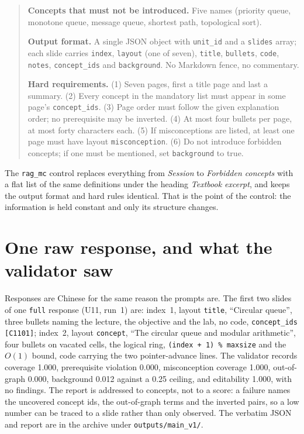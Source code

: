 \documentclass[11pt,a4paper]{article}
\newcommand{\id}[1]{\texttt{#1}}
\begin{document}
\begin{quote}
\textbf{Concepts that must not be introduced.} Five names (priority queue,
monotone queue, message queue, shortest path, topological sort).

\textbf{Output format.} A single JSON object with \id{unit\_id} and a
\id{slides} array; each slide carries \id{index}, \id{layout} (one of seven),
\id{title}, \id{bullets}, \id{code}, \id{notes}, \id{concept\_ids} and
\id{background}. No Markdown fence, no commentary.

\textbf{Hard requirements.} (1) Seven pages, first a title page and last a
summary. (2) Every concept in the mandatory list must appear in some page's
\id{concept\_ids}. (3) Page order must follow the given explanation order; no
prerequisite may be inverted. (4) At most four bullets per page, at most forty
characters each. (5) If misconceptions are listed, at least one page must have
layout \id{misconception}. (6) Do not introduce forbidden concepts; if one must
be mentioned, set \id{background} to true.
\end{quote}

The \id{rag\_mc} control replaces everything from \emph{Session} to
\emph{Forbidden concepts} with a flat list of the same definitions under the
heading \emph{Textbook excerpt}, and keeps the output format and hard rules
identical. That is the point of the control: the information is held constant
and only its structure changes.

\section{One raw response, and what the validator saw}
\label{sec:s8}

Responses are Chinese for the same reason the prompts are. The first two slides of
one \id{full} response (U11, run~1) are: index~1, layout \id{title}, ``Circular
queue'', three bullets naming the lecture, the objective and the lab, no code,
\id{concept\_ids} \id{[C1101]}; index~2, layout \id{concept}, ``The circular queue
and modular arithmetic'', four bullets on vacated cells, the logical ring,
\id{(index + 1) \% maxsize} and the $O(1)$ bound, code carrying the two
pointer-advance lines. The validator records coverage 1.000, prerequisite
violation 0.000, misconception coverage 1.000, out-of-graph 0.000, background
0.012 against a 0.25 ceiling, and editability 1.000, with no findings. The report
is addressed to concepts, not to a score: a failure names the uncovered concept
ids, the out-of-graph terms and the inverted pairs, so a low number can be traced
to a slide rather than only observed. The verbatim JSON and report are in the
archive under \id{outputs/main\_v1/}.
\end{document}
